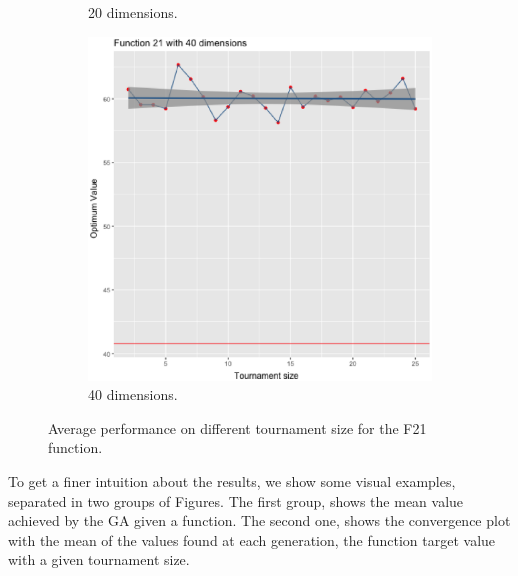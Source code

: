 \begin{figure}[t]
\begin{subfigure}[b]{0.33\textwidth}
		\caption{20 dimensions.}
	\end{subfigure}
	\begin{subfigure}[b]{0.33\textwidth}
		\centering
		\includegraphics[width=\textwidth]{img/21dim_40.ps}
		\caption{40 dimensions.}
	\end{subfigure}
	\caption{Average performance on different tournament size for the F21 function.}
	\label{21}
\end{figure}


To get a finer intuition about the results, we show  some visual examples, separated in two groups of Figures. The first group, shows the mean value achieved by the GA given a function. The second one, shows the convergence plot with the mean of the values found at each generation, the function target value with a given tournament size.






